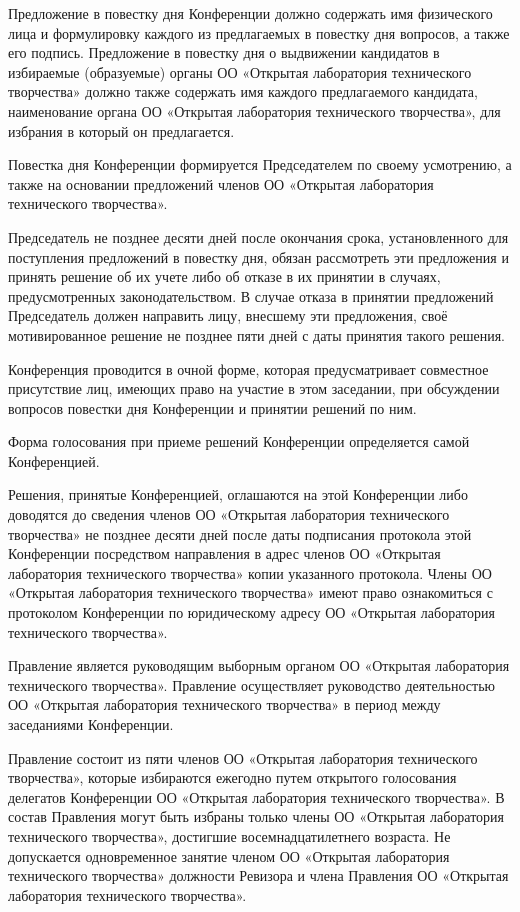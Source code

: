 \documentclass[a4paper,14pt,titlepage]{extarticle}
\begin{document}
Предложение в повестку дня Конференции должно содержать имя физического лица и формулировку каждого из предлагаемых в
повестку дня вопросов, а также его подпись. Предложение в повестку дня о выдвижении кандидатов в избираемые (образуемые)
органы ОО «Открытая лаборатория технического творчества» должно также содержать имя каждого предлагаемого кандидата,
наименование органа ОО «Открытая лаборатория технического творчества», для избрания в который он предлагается.

Повестка дня Конференции формируется Председателем по своему усмотрению, а также на основании предложений членов ОО
«Открытая лаборатория технического творчества». 

Председатель не позднее десяти дней после окончания срока, установленного для поступления предложений в повестку дня,
обязан рассмотреть эти предложения и принять решение об их учете либо об отказе в их принятии в случаях, предусмотренных
законодательством. В случае отказа в принятии предложений Председатель должен направить лицу, внесшему эти предложения,
своё мотивированное решение не позднее пяти дней с даты принятия такого решения.

Конференция проводится в очной форме, которая предусматривает совместное присутствие лиц, имеющих право на участие в
этом заседании, при обсуждении вопросов повестки дня Конференции и принятии решений по ним.

Форма голосования при приеме решений Конференции определяется самой Конференцией.

Решения, принятые Конференцией, оглашаются на этой Конференции либо доводятся до сведения членов ОО «Открытая
лаборатория технического творчества» не позднее десяти дней после даты подписания протокола этой Конференции посредством
направления в адрес членов ОО «Открытая лаборатория технического творчества» копии указанного протокола. Члены ОО
«Открытая лаборатория технического творчества» имеют право ознакомиться с протоколом Конференции по юридическому адресу
ОО «Открытая лаборатория технического творчества».

Правление является руководящим выборным органом ОО «Открытая лаборатория технического творчества». Правление
осуществляет руководство деятельностью ОО «Открытая лаборатория технического творчества» в период между заседаниями
Конференции.

Правление состоит из пяти членов ОО «Открытая лаборатория технического творчества», которые избираются ежегодно путем
открытого голосования делегатов Конференции ОО «Открытая лаборатория технического творчества». В состав Правления могут
быть избраны только члены ОО «Открытая лаборатория технического творчества», достигшие восемнадцатилетнего возраста. Не
допускается одновременное занятие членом ОО «Открытая лаборатория технического творчества» должности Ревизора и члена
Правления ОО «Открытая лаборатория технического творчества».
\end{document}
